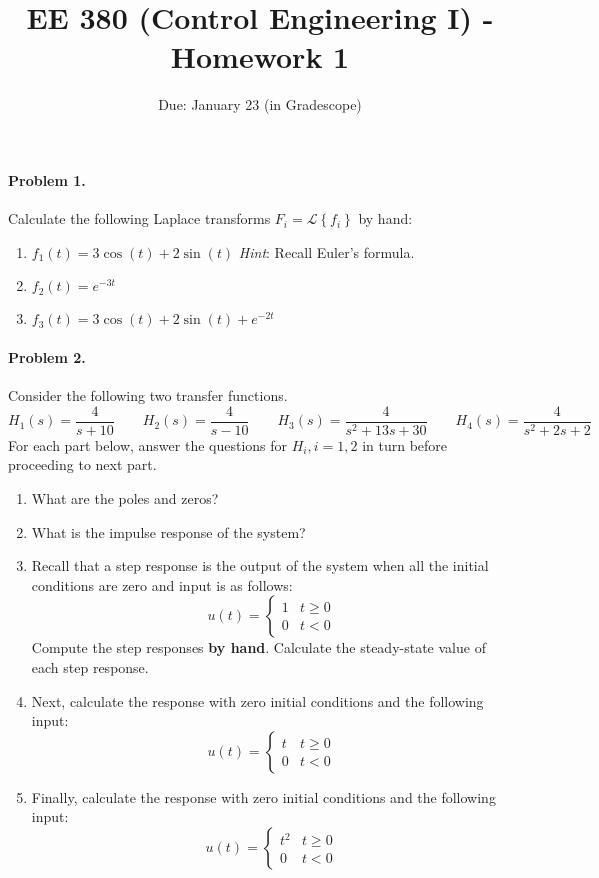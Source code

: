 \documentclass[10pt]{article}
\title{EE 380 (Control Engineering I) - Homework 1 }
\author{Due: January 23 (in Gradescope)}
\date{}
\begin{document}
\maketitle
\paragraph{Problem 1.}
Calculate the following Laplace transforms $F_{i}=\mathcal{L}\left\{f_{i}\right\}$ by hand:

\begin{enumerate}[label=(\alph*)]
    \item $f_{1}(t)=3 \cos (t)+2 \sin (t)$ \qquad \textit{Hint}: Recall Euler's formula.
    \item $f_{2}(t)=e^{-3 t}$
    \item $f_{3}(t)=3 \cos (t)+2 \sin (t)+e^{-2 t}$
\end{enumerate}

\paragraph{Problem 2.} Consider the following two transfer functions.
$$
H_{1}(s)=\frac{4}{s+10} \quad \quad H_{2}(s)=\frac{4}{s-10} \quad \quad H_{3}(s)=\frac{4}{s^2+13s+30} \quad \quad H_{4}(s)=\frac{4}{s^{2}+2 s+2}
$$
For each part below, answer the questions for $H_{i}, i=1,2$ in turn before proceeding to next part.
\begin{enumerate}[label=(\alph*)]
    \item  What are the poles and zeros?
    \item What is the impulse response of the system?
    \item Recall that a step response is the output of the system when all the initial conditions are zero and input is as follows:
    $$
    u(t)= \begin{cases}1 & t \geq 0 \\ 0 & t<0\end{cases}
    $$
    Compute the step responses \textbf{by hand}. Calculate the steady-state value of each step response.\\
    \item Next, calculate the response with zero initial conditions and the following input:
    $$
    u(t)= \begin{cases}t & t \geq 0 \\ 0 & t<0\end{cases}
    $$
    \item Finally, calculate the response with zero initial conditions and the following input:
    $$
    u(t)= \begin{cases}t^{2} & t \geq 0 \\ 0 & t<0\end{cases}
    $$
\end{enumerate}
\end{document}
